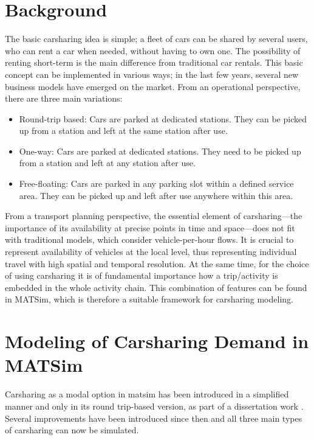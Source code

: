 \section{Background}
The basic carsharing idea is simple; a fleet of cars can be shared by several users, who can rent a car when needed, without having to own one. The possibility of renting short-term is the main difference from traditional car rentals. This basic concept can be implemented in various ways; in the last few years, several new business models have emerged on the market. From an operational perspective, there are three main variations:
%
\begin{itemize}\styleItemize
	\item Round-trip based: Cars are parked at dedicated stations. They can be picked up from a station and left at the same station after use.
	\item One-way: Cars are parked at dedicated stations. They need to be picked up from a station and left at any station after use.
	\item Free-floating: Cars are parked in any parking slot within a defined service area. They can be picked up and left after use anywhere within this area. 
\end{itemize}
%
From a transport planning perspective, the essential element  of carsharing---the importance of its availability at precise points in time and space---does not fit with traditional models, which consider vehicle-per-hour flows. It is crucial to represent availability of vehicles at the local level, thus representing individual travel with high spatial and temporal resolution. At the same time, for the choice of using carsharing it is of fundamental importance how a trip/activity is embedded in the whole activity chain. This combination of features can be found in MATSim, which is therefore a suitable framework for carsharing modeling. 

\section{Modeling of Carsharing Demand in MATSim}
Carsharing as a modal option in \gls{matsim} has been introduced in a simplified manner and only in its round trip-based version, as part of a dissertation work \citep[][]{Ciari_PhDThesis_2012}. Several improvements have been introduced since then and all three main types of carsharing can now be simulated.

